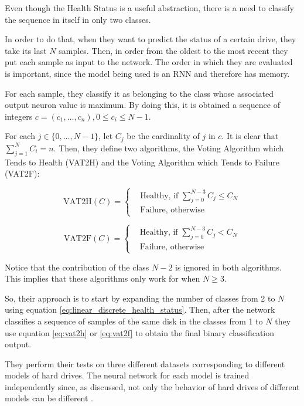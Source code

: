 Even though the Health Status is a useful abstraction, there is a need to classify the sequence in itself in only two classes.

In order to do that, when they want to predict the status of a certain drive, they take its last $N$ samples.
Then, in order from the oldest to the most recent they put each sample as input to the network.
The order in which they are evaluated is important, since the model being used is an RNN and therefore has memory.

For each sample, they classify it as belonging to the class whose associated output neuron value is maximum.
By doing this, it is obtained a sequence of integers $c = (c_1, \dots, c_n), 0 \leq c_i \leq N-1$.

For each $j \in \{0,\dots,N-1\}$, let $C_j$ be the cardinality of $j$ in $c$.
It is clear that $\sum_{j=1}^N C_i = n$.
Then, they define two algorithms, the Voting Algorithm which Tends to Health (VAT2H) and the Voting Algorithm which Tends to Failure (VAT2F):

\begin{equation}\label{eq:vat2h}
    \text{VAT2H}(C) = 
    \begin{cases}
        & \text{Healthy, if } \sum_{j=0}^{N-3}C_j \leq C_N \\
        & \text{Failure, otherwise}
    \end{cases}
\end{equation}

\begin{equation}\label{eq:vat2f}
    \text{VAT2F}(C) = 
    \begin{cases}
        & \text{Healthy, if } \sum_{j=0}^{N-3}C_j < C_N \\
        & \text{Failure, otherwise}
    \end{cases}
\end{equation}

Notice that the contribution of the class $N-2$ is ignored in both algorithms.
This implies that these algorithms only work for when $N \geq 3$.

So, their approach is to start by expanding the number of classes from 2 to $N$ using equation \ref{eq:linear_discrete_health_status}.
Then, after the network classifies a sequence of samples of the same disk in the classes from 1 to $N$ they use equation \ref{eq:vat2h} or \ref{eq:vat2f} to obtain the final binary classification output.

They perform their tests on three different datasets corresponding to different models of hard drives.
The neural network for each model is trained independently since, as discussed, not only the behavior of hard drives of different models can be different \cite{Xu16}.

